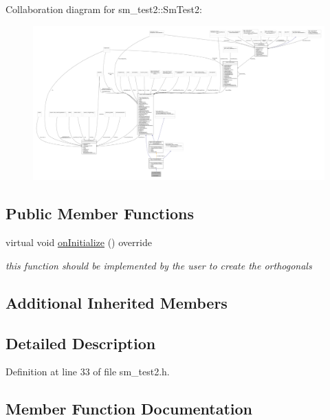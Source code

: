 Collaboration diagram for sm\+\_\+test2\+:\+:Sm\+Test2\+:
\nopagebreak
\begin{figure}[H]
\begin{center}
\leavevmode
\includegraphics[width=350pt]{structsm__test2_1_1SmTest2__coll__graph}
\end{center}
\end{figure}
\subsection*{Public Member Functions}
\begin{DoxyCompactItemize}
\item 
virtual void \hyperlink{structsm__test2_1_1SmTest2_a38c0876f9ee98101cdc7e46887890571}{on\+Initialize} () override
\begin{DoxyCompactList}\small\item\em this function should be implemented by the user to create the orthogonals \end{DoxyCompactList}\end{DoxyCompactItemize}
\subsection*{Additional Inherited Members}


\subsection{Detailed Description}


Definition at line 33 of file sm\+\_\+test2.\+h.



\subsection{Member Function Documentation}
\mbox{\label{structsm__test2_1_1SmTest2_a38c0876f9ee98101cdc7e46887890571}} 
